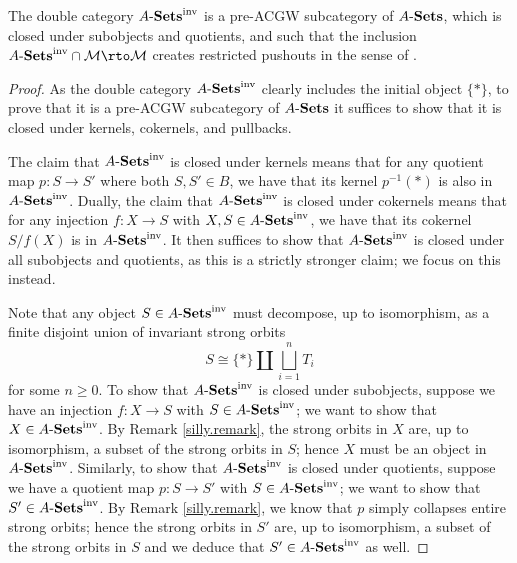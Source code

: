 \documentclass[11pt]{amsart}
\begin{document}
\begin{proposition}\label{B.is.preACGW}
    The double category $A\text{-}\mathbf{Sets}^{\mathrm{inv}}$ is a pre-ACGW subcategory of $A\text{-}\mathbf{Sets}$, which is closed under subobjects and quotients, and such that the inclusion $\ASets^\inv\cap \M\to \M$ creates restricted pushouts in the sense of \cite[Definition 6.1]{CZ-cgw}. 
\end{proposition}
\begin{proof}
    As the double category $A\text{-}\mathbf{Sets}^{\mathrm{inv}}$ clearly includes the initial object $\{*\}$, to prove that it is a pre-ACGW subcategory of $A\text{-}\mathbf{Sets}$ it suffices to show that it is closed under kernels, cokernels, and pullbacks. 

    The claim that $A\text{-}\mathbf{Sets}^{\mathrm{inv}}$ is closed under kernels means that for any quotient map $p\colon S\to S'$ where both $S,S'\in B$, we have that its kernel $p^{-1}(*)$ is also in $A\text{-}\mathbf{Sets}^{\mathrm{inv}}$. Dually, the claim that $A\text{-}\mathbf{Sets}^{\mathrm{inv}}$ is closed under cokernels means that for any injection $f\colon X\to S$ with $X,S\in A\text{-}\mathbf{Sets}^{\mathrm{inv}}$, we have that its cokernel $S/f(X)$ is in $A\text{-}\mathbf{Sets}^{\mathrm{inv}}$. It then suffices to show that $A\text{-}\mathbf{Sets}^{\mathrm{inv}}$ is closed under all subobjects and quotients, as this is a strictly stronger claim; we focus on this instead. 

Note that any object $S\in A\text{-}\mathbf{Sets}^{\mathrm{inv}}$ must decompose, up to isomorphism, as a finite disjoint union of invariant strong orbits \[S\cong \{*\}\amalg\bigsqcup_{i=1}^n T_i\] for some $n\geq 0$. To show that $A\text{-}\mathbf{Sets}^{\mathrm{inv}}$ is closed under subobjects, suppose we have an injection $f\colon X\to S$ with $S\in A\text{-}\mathbf{Sets}^{\mathrm{inv}}$; we want to show that $X\in A\text{-}\mathbf{Sets}^{\mathrm{inv}}$. By Remark \ref{silly.remark}, the strong orbits in $X$ are, up to isomorphism, a subset of the strong orbits in $S$; hence $X$ must be an object in $A\text{-}\mathbf{Sets}^{\mathrm{inv}}$. Similarly, to show that $A\text{-}\mathbf{Sets}^{\mathrm{inv}}$ is closed under quotients, suppose we have a quotient map $p\colon S\to S'$ with $S\in A\text{-}\mathbf{Sets}^{\mathrm{inv}}$; we want to show that $S'\in A\text{-}\mathbf{Sets}^{\mathrm{inv}}$. By Remark \ref{silly.remark}, we know that $p$ simply collapses entire strong orbits; hence the strong orbits in $S'$ are, up to isomorphism, a subset of the strong orbits in $S$ and we deduce that $S'\in A\text{-}\mathbf{Sets}^{\mathrm{inv}}$ as well. 



\end{proof}
\end{document}
